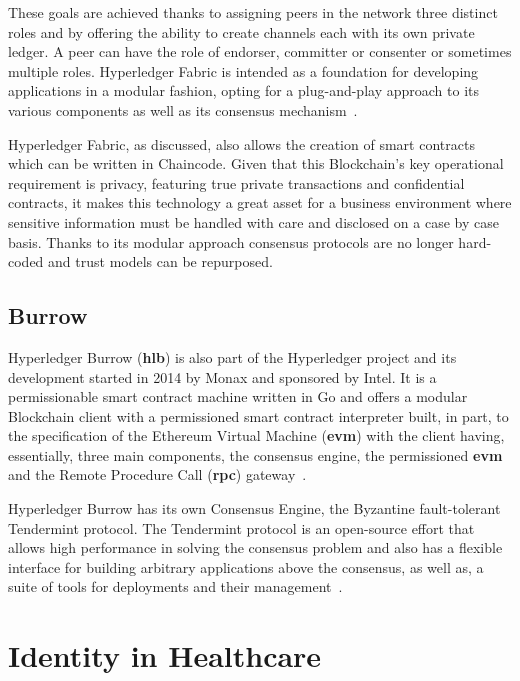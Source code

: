   These goals are achieved thanks to assigning peers in the network three
  distinct roles and by offering the ability to create channels each with its
  own private ledger.  A peer can have the role of endorser, committer or
  consenter or sometimes multiple roles.  Hyperledger Fabric is intended as a
  foundation for developing applications in a modular fashion, opting for a
  plug-and-play approach to its various components as well as its consensus
  mechanism~\cite{HyperledgerFabricDocs2017}.

  Hyperledger Fabric, as discussed, also allows the creation of smart contracts
  which can be written in Chaincode.  Given that this Blockchain's key
  operational requirement is privacy, featuring true private transactions and
  confidential contracts, it makes this technology a great asset for a business
  environment where sensitive information must be handled with care and
  disclosed on a case by case basis.  Thanks to its modular approach consensus
  protocols are no longer hard-coded and trust models can be repurposed.

  \subsection{Burrow}

  Hyperledger Burrow (\textbf{hlb}) is also part of the Hyperledger project and
  its development started in 2014 by Monax and sponsored by Intel. It is a
  permissionable smart contract machine written in Go and offers a modular
  Blockchain client with a permissioned smart contract interpreter built, in
  part, to the specification of the Ethereum Virtual Machine (\textbf{evm})
  with the client having, essentially, three main components, the consensus
  engine, the permissioned \textbf{evm} and the Remote Procedure Call
  (\textbf{rpc}) gateway~\cite{Kuhlman2017,HyperledgerBurrow2017}.

  Hyperledger Burrow has its own Consensus Engine, the Byzantine fault-tolerant
  Tendermint protocol.  The Tendermint protocol is an open-source effort that
  allows high performance in solving the consensus problem and also has a
  flexible interface for building arbitrary applications above the consensus,
  as well as, a suite of tools for deployments and their
  management~\cite{Buchman2016}.
  
  \section{Identity in Healthcare}
  
